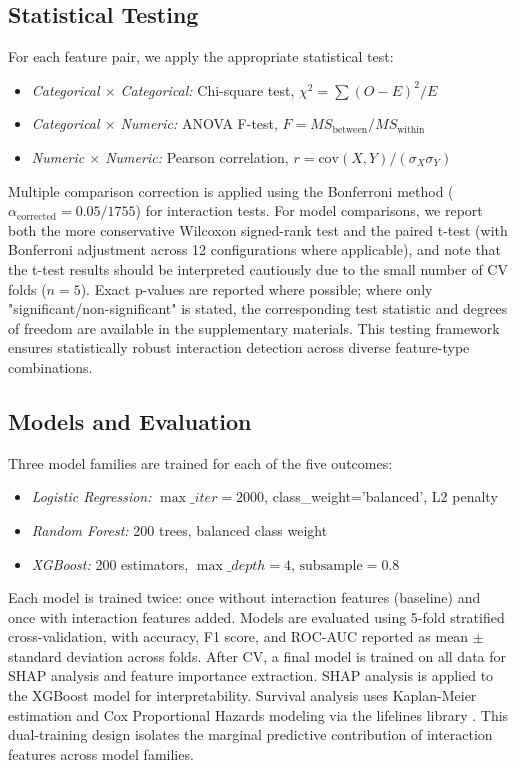 \documentclass[conference]{IEEEtran}
\begin{document}
\subsection{Statistical Testing}

For each feature pair, we apply the appropriate statistical test:

\begin{itemize}
    \item \textit{Categorical $\times$ Categorical:} Chi-square test, $\chi^2 = \sum (O - E)^2 / E$
    \item \textit{Categorical $\times$ Numeric:} ANOVA F-test, $F = MS_{\text{between}} / MS_{\text{within}}$
    \item \textit{Numeric $\times$ Numeric:} Pearson correlation, $r = \text{cov}(X,Y) / (\sigma_X \sigma_Y)$
\end{itemize}

Multiple comparison correction is applied using the Bonferroni method ($\alpha_{\text{corrected}} = 0.05 / 1755$) for interaction tests. For model comparisons, we report both the more conservative Wilcoxon signed-rank test and the paired t-test (with Bonferroni adjustment across 12 configurations where applicable), and note that the t-test results should be interpreted cautiously due to the small number of CV folds ($n=5$). Exact p-values are reported where possible; where only "significant/non-significant" is stated, the corresponding test statistic and degrees of freedom are available in the supplementary materials. This testing framework ensures statistically robust interaction detection across diverse feature-type combinations.

\subsection{Models and Evaluation}

Three model families are trained for each of the five outcomes:

\begin{itemize}
    \item \textit{Logistic Regression:} $\max\_iter=2000$, class\_weight='balanced', L2 penalty
    \item \textit{Random Forest:} 200 trees, balanced class weight
    \item \textit{XGBoost:} 200 estimators, $\max\_depth=4$, $\text{subsample}=0.8$
\end{itemize}

Each model is trained twice: once without interaction features (baseline) and once with interaction features added. Models are evaluated using 5-fold stratified cross-validation, with accuracy, F1 score, and ROC-AUC reported as mean $\pm$ standard deviation across folds. After CV, a final model is trained on all data for SHAP analysis and feature importance extraction. SHAP analysis \cite{lundberg2017unified} is applied to the XGBoost model for interpretability. Survival analysis uses Kaplan-Meier estimation and Cox Proportional Hazards modeling via the lifelines library \cite{davidson2019lifelines}. This dual-training design isolates the marginal predictive contribution of interaction features across model families.
\end{document}
